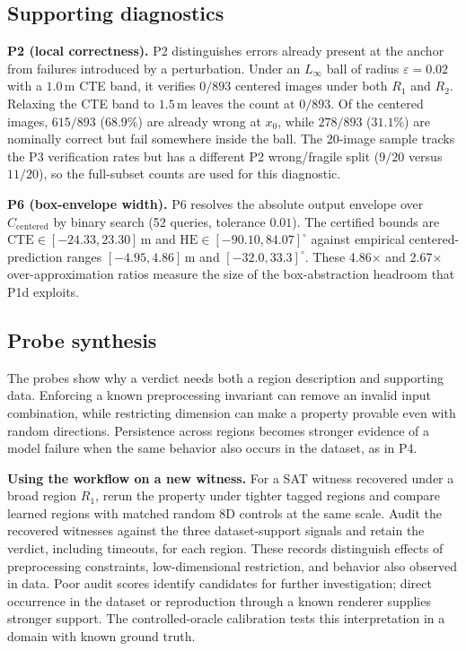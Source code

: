 \documentclass[twocolumn,smallextended,runningheads]{svjour3}
\begin{document}
\subsection{Supporting diagnostics}
\label{sec:supporting_diagnostics}
\label{sec:p2_supporting}
\label{sec:p6_results}

\textbf{P2 (local correctness).} P2 distinguishes errors already present at the anchor from failures introduced by a perturbation. Under an $L_\infty$ ball of radius $\varepsilon{=}0.02$ with a $1.0$\,m CTE band, it verifies $0/893$ centered images under both $R_1$ and $R_2$. Relaxing the CTE band to $1.5$\,m leaves the count at $0/893$. Of the centered images, $615/893$ ($68.9\%$) are already wrong at $x_0$, while $278/893$ ($31.1\%$) are nominally correct but fail somewhere inside the ball. The 20-image sample tracks the P3 verification rates but has a different P2 wrong/fragile split ($9/20$ versus $11/20$), so the full-subset counts are used for this diagnostic.

\textbf{P6 (box-envelope width).} P6 resolves the absolute output envelope over $C_\text{centered}$ by binary search (52 queries, tolerance $0.01$). The certified bounds are $\mathrm{CTE} \in [-24.33, 23.30]$\,m and $\mathrm{HE} \in [-90.10, 84.07]^\circ$ against empirical centered-prediction ranges $[-4.95, 4.86]$\,m and $[-32.0, 33.3]^\circ$. These 4.86$\times$ and 2.67$\times$ over-approximation ratios measure the size of the box-abstraction headroom that P1d exploits.

\subsection{Probe synthesis}
\label{sec:probe_synthesis}

The probes show why a verdict needs both a region description and supporting data. Enforcing a known preprocessing invariant can remove an invalid input combination, while restricting dimension can make a property provable even with random directions. Persistence across regions becomes stronger evidence of a model failure when the same behavior also occurs in the dataset, as in P4.

\textbf{Using the workflow on a new witness.} For a SAT witness recovered under a broad region $R_1$, rerun the property under tighter tagged regions and compare learned regions with matched random 8D controls at the same scale. Audit the recovered witnesses against the three dataset-support signals and retain the verdict, including timeouts, for each region. These records distinguish effects of preprocessing constraints, low-dimensional restriction, and behavior also observed in data. Poor audit scores identify candidates for further investigation; direct occurrence in the dataset or reproduction through a known renderer supplies stronger support. The controlled-oracle calibration tests this interpretation in a domain with known ground truth.
\end{document}
